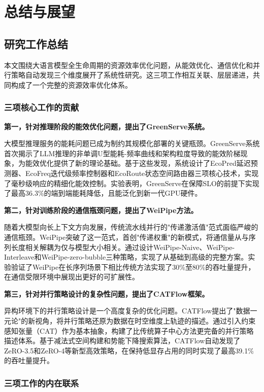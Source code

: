 
\chapter{总结与展望}

\section{研究工作总结}

本文围绕大语言模型全生命周期的资源效率优化问题，从能效优化、通信优化和并行策略自动发现三个维度展开了系统性研究。这三项工作相互关联、层层递进，共同构成了一个完整的资源效率优化体系。

\subsection{三项核心工作的贡献}

\textbf{第一，针对推理阶段的能效优化问题，提出了GreenServe系统。}

大模型推理服务的能耗问题已成为制约其规模化部署的关键瓶颈。GreenServe系统首次揭示了LLM推理的非单调U型能耗-频率曲线和架构粒度导致的能效阶梯现象，为能效优化提供了新的理论基础。基于这些发现，系统设计了EcoPred延迟预测器、EcoFreq迭代级频率控制器和EcoRoute状态空间路由器三项核心技术，实现了毫秒级响应的精细化能效控制。实验表明，GreenServe在保障SLO的前提下实现了最高36.3\%的端到端能耗降低，且能泛化到新一代GPU硬件。

\textbf{第二，针对训练阶段的通信瓶颈问题，提出了WeiPipe方法。}

随着大模型向长上下文方向发展，传统流水线并行的"传递激活值"范式面临严峻的通信瓶颈。WeiPipe突破了这一范式，首创"传递权重"的新模式，将通信量从与序列长度相关解耦为仅与模型大小相关。通过设计WeiPipe-Naive、WeiPipe-Interleave和WeiPipe-zero-bubble三种策略，实现了从基础到高级的完整方案。实验验证了WeiPipe在长序列场景下相比传统方法实现了30\%至80\%的吞吐量提升，在通信受限环境中展现出更好的可扩展性。

\textbf{第三，针对并行策略设计的复杂性问题，提出了CATFlow框架。}

异构环境下的并行策略设计是一个高度复杂的优化问题。CATFlow提出了"数据一元论"的新视角，将并行策略还原为数据在时空维度上轨迹的描述。通过引入约束感知张量（CAT）作为基本抽象，构建了比传统算子中心方法更完备的并行策略描述体系。基于减法式空间构建和势能下降搜索算法，CATFlow自动发现了ZeRO-3.5和ZeRO-4等新型高效策略，在保持低显存占用的同时实现了最高39.1\%的吞吐量提升。

\subsection{三项工作的内在联系}

